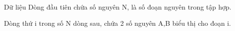 Dữ liệu
Dòng đầu tiên chứa số nguyên N, là số đoạn nguyên trong tập hợp.  

   Dòng thứ i trong số N dòng sau, chứa 2 số nguyên A,B  biểu thị cho đoạn i.